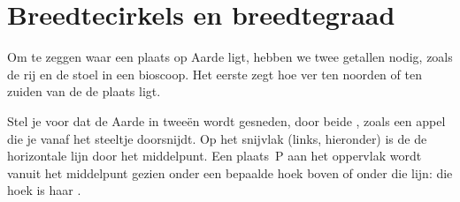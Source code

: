 \section{Breedtecirkels en breedtegraad}

Om te zeggen waar een plaats op Aarde ligt, hebben we twee getallen nodig,
zoals de rij en de stoel in een bioscoop. Het eerste zegt hoe ver ten
noorden of ten zuiden van de  de plaats ligt.

Stel je voor dat de Aarde in tweeën wordt gesneden, door beide , zoals
een appel die je vanaf het steeltje doorsnijdt. Op het snijvlak (links,
hieronder) is de  de horizontale lijn door het middelpunt. Een
plaats~P aan het oppervlak wordt vanuit het middelpunt gezien onder een
bepaalde hoek boven of onder die lijn: die hoek is haar .

